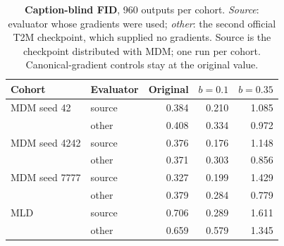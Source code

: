 \begin{table}[t]\centering\footnotesize\setlength{\tabcolsep}{3.5pt}
\caption{\textbf{Caption-blind FID}, 960 outputs per cohort. \emph{Source}: evaluator whose gradients were used; \emph{other}: the second official T2M checkpoint, which supplied no gradients. Source is the checkpoint distributed with MDM; one run per cohort. Canonical-gradient controls stay at the original value.}\label{tab:blind}
\begin{tabular}{@{}llrrr@{}}\toprule
Cohort&Evaluator&Original&$b=0.1$&$b=0.35$\\\midrule
MDM seed 42&source&0.384&0.210&1.085\\
&other&0.408&0.334&0.972\\
MDM seed 4242&source&0.376&0.176&1.148\\
&other&0.371&0.303&0.856\\
MDM seed 7777&source&0.327&0.199&1.429\\
&other&0.379&0.284&0.779\\
MLD&source&0.706&0.289&1.611\\
&other&0.659&0.579&1.345\\
\bottomrule\end{tabular}\end{table}
